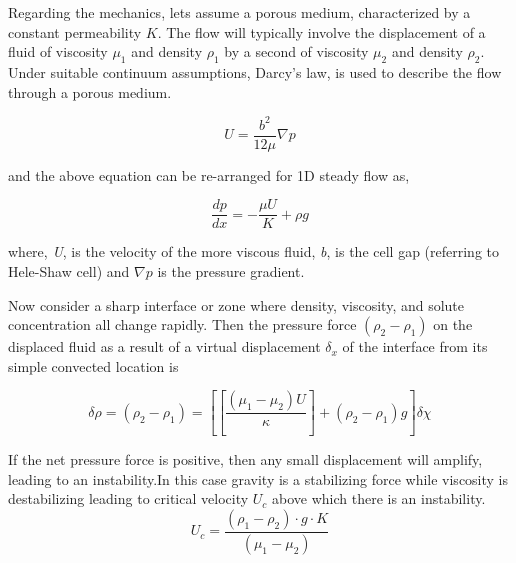 \documentclass[preprint,authoryear,12pt]{elsarticle}
\begin{document}

Regarding the mechanics, lets assume a porous medium, characterized by a constant permeability $K$. The flow will typically involve the displacement of a fluid of viscosity $\mu_1$  and density $\rho_1$ by a second of viscosity $\mu_2$ and density $\rho_2$. Under suitable continuum assumptions, Darcy's law, is used to describe the flow through a porous medium.

\begin{equation}
 U = \frac{b^2}{12 \mu} \nabla p
\end{equation}

and the above equation can be re-arranged for 1D steady flow as,

\begin{equation}
 \frac{dp}{dx}= - \frac{\mu U}{K} + \rho g 
\end{equation}


where, \textit{U}, is the velocity of the more viscous fluid, \textit{b}, is the cell gap (referring to Hele-Shaw cell) and \textit{$\nabla p$} is the pressure gradient.

Now consider a sharp interface or zone where density, viscosity, and solute concentration all change rapidly. Then the pressure force $(\rho_2-\rho_1)$ on the displaced fluid as a result of a virtual displacement $\delta_x$ of the interface from its simple convected location is 

\begin{equation}
\delta\rho=(\rho_2-\rho_1)=[[\frac{(\mu_1-\mu_2)U}{\kappa}]+(\rho_2-\rho_1)g] \delta\chi
\end{equation}

If the net pressure force is positive, then any small displacement will amplify, leading to an instability.In this case gravity is a stabilizing force while viscosity is destabilizing leading to critical velocity $U_c$ above which there is an instability.\\

\begin{equation}
U_c = \frac{(\rho_1-\rho_2) \cdot g \cdot K}{(\mu_1-\mu_2)}
\end{equation}
\end{document}

